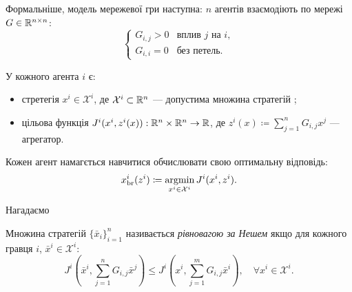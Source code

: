 Формальніше, модель мережевої гри наступна: $n$ агентів взаємодіють по мережі $G \in \mathbb{R}^{n \times n}$:
\begin{equation}
    \begin{cases}
        G_{i,j} > 0 & \text{вплив }j\text{ на }i, \\
        G_{i,i} = 0 & \text{без петель}.
    \end{cases}
\end{equation}

У кожного агента $i$ є:
\begin{itemize}
    \item стретегія $x^i \in \mathcal{X}^i$, де $\mathcal{X}^i \subset \mathbb{R}^n$ --- допустима множина стратегій ;
    \item цільова функція $J^i(x^i, z^i(x)): \mathbb{R}^n \times \mathbb{R}^n \to \mathbb{R}$, де $z^i(x) \coloneqq \sum_{j = 1}^n G_{i,j} x^j$ --- агрегатор.
\end{itemize}

Кожен агент намагється навчитися обчислювати свою оптимальну відповідь:
\begin{equation}
    x_\text{br}^i(z^i) \coloneqq \operatorname*{argmin}_{x^i \in \mathcal{X}^i} J^i(x^i, z^i).
\end{equation}

Нагадаємо
\begin{definition}
    Множина стратегій $\{\bar x_i\}_{i = 1}^n$ називається \emph{рівновагою за Нешем} якщо для кожного гравця $i$, $\bar x^i \in \mathcal{X}^i$:
    \begin{equation}
        J^i \left( \bar x^i, \sum_{j = 1}^n G_{i,j} \bar x^j \right) \le J^i \left( x^i, \sum_{j = 1}^m G_{i,j} \bar x^i \right), \quad \forall x^i \in \mathcal{X}^i.
    \end{equation}
\end{definition}

